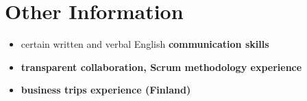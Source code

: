 \section*{Other Information}
\begin{itemize}
    \item certain written and verbal English \bfseries communication skills \mdseries
    \item \bfseries transparent \mdseries collaboration, \bfseries Scrum \mdseries methodology experience
    \item \bfseries business trips \mdseries experience (Finland)
\end{itemize}

